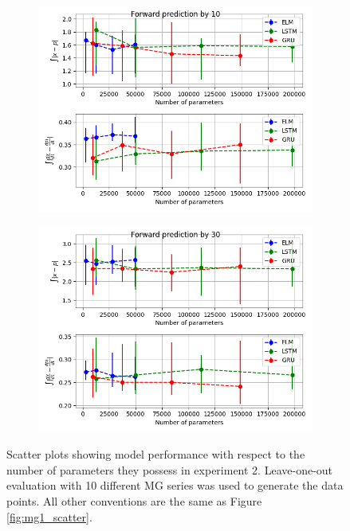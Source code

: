 \documentclass[11pt]{article}
\begin{document}
\begin{figure}
\begin{center}
\begin{subfigure}{.48\textwidth}
     \includegraphics[width=\textwidth]{figures/mg2_scatter_10.png}
     \caption{}
   \end{subfigure}
   \begin{subfigure}{.48\textwidth}
     \includegraphics[width=\textwidth]{figures/mg2_scatter_30.png}
     \caption{}
   \end{subfigure}
       
    \caption{Scatter plots showing model performance with respect to
      the number of parameters they possess in experiment 2. Leave-one-out evaluation with 10 different MG series was used to generate the data points. All other conventions are the same as Figure \ref{fig:mg1_scatter}.}
    \label{fig:mg2_scatter}
    \end{center}
  \end{figure}
\end{document}
